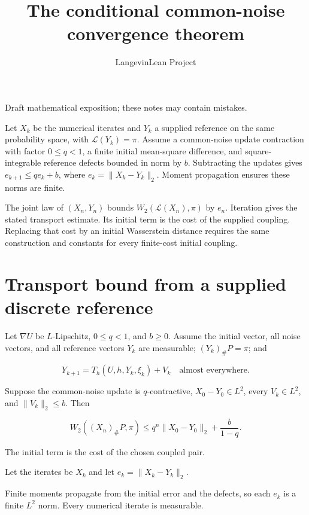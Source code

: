 \documentclass[11pt,a4paper]{article}
\title{\texorpdfstring{The conditional common-noise convergence theorem}{The conditional common-noise convergence theorem}}
\author{LangevinLean Project}
\date{}
\begin{document}
\maketitle
Draft mathematical exposition; these notes may contain mistakes.


Let \(X_k\) be the numerical iterates and \(Y_k\) a supplied reference on the same probability space, with \(\mathcal L(Y_k)=\pi\). Assume a common-noise update contraction with factor \(0\le q<1\), a finite initial mean-square difference, and square-integrable reference defects bounded in norm by \(b\). Subtracting the updates gives \(e_{k+1}\le qe_k+b\), where \(e_k=\|X_k-Y_k\|_2\). Moment propagation ensures these norms are finite.



The joint law of \((X_n,Y_n)\) bounds \(W_2(\mathcal L(X_n),\pi)\) by \(e_n\). Iteration gives the stated transport estimate. Its initial term is the cost of the supplied coupling. Replacing that cost by an initial Wasserstein distance requires the same construction and constants for every finite-cost initial coupling.


\section{\texorpdfstring{Transport bound from a supplied discrete reference}{Transport bound from a supplied discrete reference}}


Let \(\nabla U\) be \(L\)-Lipschitz, \(0\le q<1\), and \(b\ge0\). Assume the initial vector, all noise vectors, and all reference vectors \(Y_k\) are measurable; \((Y_k)_\#P=\pi\); and

\[Y_{k+1}=T_h(U,h,Y_k,\xi_k)+V_k\quad\text{almost everywhere}.\]

Suppose the common-noise update is \(q\)-contractive, \(X_0-Y_0\in L^2\), every \(V_k\in L^2\), and \(\|V_k\|_2\le b\). Then

\[W_2((X_n)_\#P,\pi)\le q^n\|X_0-Y_0\|_2+\frac b{1-q}.\]

The initial term is the cost of the chosen coupled pair.



Let the iterates be \(X_k\) and let \(e_k=\|X_k-Y_k\|_2\).



Finite moments propagate from the initial error and the defects, so each \(e_k\) is a finite \(L^2\) norm. Every numerical iterate is measurable.
\end{document}
